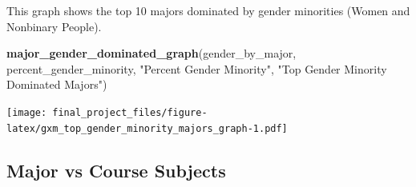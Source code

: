 \documentclass[
  twocolumn]{article}
\newenvironment{Shaded}{\begin{snugshade}}{\end{snugshade}}
\newcommand{\FunctionTok}[1]{\textcolor[rgb]{0.13,0.29,0.53}{\textbf{#1}}}
\newcommand{\NormalTok}[1]{#1}
\newcommand{\StringTok}[1]{\textcolor[rgb]{0.31,0.60,0.02}{#1}}
\begin{document}
This graph shows the top 10 majors dominated by gender minorities (Women
and Nonbinary People).

\begin{Shaded}
\begin{Highlighting}[]
\FunctionTok{major\_gender\_dominated\_graph}\NormalTok{(gender\_by\_major, percent\_gender\_minority, }\StringTok{"Percent Gender Minority"}\NormalTok{, }\StringTok{"Top Gender Minority Dominated Majors"}\NormalTok{)}
\end{Highlighting}
\end{Shaded}

\texttt{[image: final\_project\_files/figure-latex/gxm\_top\_gender\_minority\_majors\_graph-1.pdf]}

\subsection{Major vs Course Subjects}\label{major-vs-course-subjects}
\end{document}
